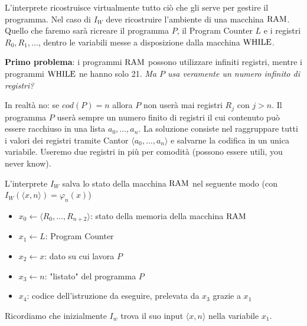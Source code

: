 L'interprete ricostruisce virtualmente tutto ciò che gli serve per gestire il programma. Nel caso di $I_W$ deve ricostruire l'ambiente di una macchina $\text{RAM}$. Quello che faremo sarà ricreare il programma $P$, il Program Counter $L$ e i registri $R_0, R_1, \dots$, dentro le variabili messe a disposizione dalla macchina $\text{WHILE}$.

\textbf{Primo problema}: i programmi $\text{RAM}$ possono utilizzare infiniti registri, mentre i programmi $\text{WHILE}$ ne hanno solo 21. \textit{Ma $P$ usa veramente un numero infinito di registri?}

In realtà no: se $cod(P) = n$ allora $P$ non userà mai registri $R_j$ con $j > n$. Il programma $P$ userà sempre un numero finito di registri il cui contenuto può essere racchiuso in una lista $a_0, \dots, a_n$. La soluzione consiste nel raggruppare tutti i valori dei registri tramite Cantor $\langle a_0, \dots, a_n \rangle$ e salvarne la codifica in un unica variabile. Useremo due registri in più per comodità (possono essere utili, you never know).

L'interprete $I_W$ salva lo stato della macchina $\text{RAM}$ nel seguente modo (con $I_W (\langle x,n\rangle) = \varphi_n (x)$)
\begin{itemize}
	\item $x_0 \leftarrow \langle R_0, \dots, R_{n+2} \rangle$: stato della memoria della macchina $\text{RAM}$
	
    \item $x_1 \leftarrow L$: Program Counter
	
    \item $x_2 \leftarrow x$: dato su cui lavora $P$
	
    \item $x_3 \leftarrow n$: "listato" del programma $P$
	
    \item $x_4$: codice dell'istruzione da eseguire, prelevata da $x_3$ grazie a $x_1$
\end{itemize}

Ricordiamo che inizialmente $I_{w}$ trova il suo input $\langle x, n \rangle$ nella variabile $x_1$.

\newpage

